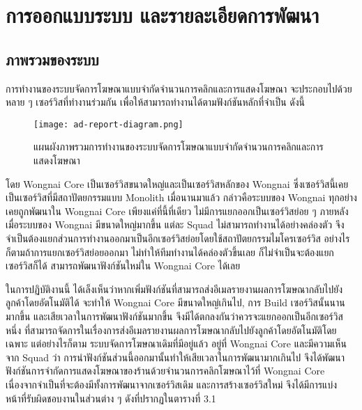 \chapter{การออกแบบระบบ และรายละเอียดการพัฒนา}
\label{chapter:system-detail}
\section{ภาพรวมของระบบ}
การทำงานของระบบจัดการโฆษณาแบบจำกัดจำนวนการคลิกและการแสดงโฆษณา จะประกอบไปด้วยหลาย ๆ เซอร์วิสที่ทำงานร่วมกัน เพื่อให้สามารถทำงานได้ตามฟังก์ชันหลักที่จำเป็น ดังนี้

\begin{figure}[!h]
	\centering
	\texttt{[image: ad-report-diagram.png]}  
	\caption{แผนผังภาพรวมการทำงานของระบบจัดการโฆษณาแบบจำกัดจำนวนการคลิกและการแสดงโฆษณา}
	\label{Fig:adreport-diagram}
\end{figure}
	
โดย Wongnai Core เป็นเซอร์วิสขนาดใหญ่และเป็นเซอร์วิสหลักของ Wongnai ซึ่งเซอร์วิสนี้เคยเป็นเซอร์วิสที่มีสถาปัตยกรรมแบบ Monolith เมื่อนานมาแล้ว กล่าวคือระบบของ Wongnai ทุกอย่างเคยถูกพัฒนาใน Wongnai Core เพียงแค่ที่นี้ที่เดียว ไม่มีการแยกออกเป็นเซอร์วิสย่อย ๆ ภายหลังเมื่อระบบของ Wongnai มีขนาดใหญ่มากขึ้น แต่ละ Squad ไม่สามารถทำงานได้อย่างคล่องตัว จึงจำเป็นต้องแยกส่วนการทำงานออกมาเป็นอีกเซอร์วิสย่อยโดยใช้สถาปัตยกรรมไมโครเซอร์วิส อย่างไรก็ตามถ้าการแยกเซอร์วิสย่อยออกมา ไม่ทำให้ทีมทำงานได้คล่องตัวขึ้นเลย ก็ไม่จำเป็นจะต้องแยกเซอร์วิสก็ได้ สามารถพัฒนาฟังก์ชันใหม่ใน Wongnai Core ได้เลย ~\cite{wnservice}

ในการปฏิบัติงานนี้ ได้เล็งเห็นว่าหากเพิ่มฟังก์ชันที่สามารถส่งอีเมลรายงานผลการโฆษณากลับไปยังลูกค้าโดยอัตโนมัติได้ จะทำให้ Wongnai Core มีขนาดใหญ่เกินไป, การ Build เซอร์วิสนั้นนานมากขึ้น และเสียเวลาในการพัฒนาฟังก์ชันมากขึ้น จึงมีได้ตกลงกันว่าควรจะแยกออกเป็นอีกเซอร์วิสหนึ่ง ที่สามารถจัดการในเรื่องการส่งอีเมลรายงานผลการโฆษณากลับไปยังลูกค้าโดยอัตโนมัติโดยเฉพาะ แต่อย่างไรก็ตาม ระบบจัดการโฆษณาเดิมที่มีอยู่แล้ว อยู่ที่ Wongnai Core และมีความเห็นจาก Squad ว่า การนำฟังก์ชันส่วนนี้ออกมานั้นทำให้เสียเวลาในการพัฒนามากเกินไป จึงได้พัฒนาฟังก์ชันการจำกัดการแสดงโฆษณาของร้านด้วยจำนวนการคลิกโฆษณาไว้ที่ Wongnai Core เนื่องจากจำเป็นที่จะต้องมีทั้งการพัฒนาจากเซอร์วิสเดิม และการสร้างเซอร์วิสใหม่ จึงได้มีการแบ่งหน้าที่รับผิดชอบงานในส่วนต่าง ๆ ดังที่ปรากฏในตารางที่ 3.1

